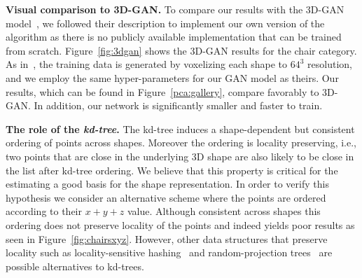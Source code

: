 \vspace{12pt}
\noindent \textbf{Visual comparison to 3D-GAN.} To compare our results with the 3D-GAN model~\cite{wu2016learning}, we followed their description to implement our own version of the algorithm as there is no publicly available implementation that can be trained from scratch. Figure~\ref{fig:3dgan} shows the 3D-GAN results for the chair category. As in~\cite{wu2016learning}, the training data is generated by voxelizing each shape to $64^3$ resolution, and we employ the same hyper-parameters for our GAN model as theirs. Our results, which can be found in Figure~\ref{pca:gallery}, compare favorably to 3D-GAN. In addition, our network is significantly smaller and faster to train.



\vspace{12pt}
\noindent \textbf{The role of the \emph{kd-tree}.} The kd-tree induces a shape-dependent but consistent ordering of points across shapes. Moreover the ordering is locality preserving, i.e., two points that are close in the underlying 3D shape are also likely to be close in the list after kd-tree ordering. We believe that this property is critical for the estimating a good basis for the shape representation. In order to verify this hypothesis we consider an alternative scheme where the points are ordered according to their $x+y+z$ value. Although consistent across shapes this ordering does not preserve locality of the points and indeed yields poor results as seen in Figure~\ref{fig:chairsxyz}. However, other data structures that preserve locality such as locality-sensitive hashing~\cite{gionis1999similarity} and random-projection trees~\cite{dasgupta2008random} are possible alternatives to kd-trees.

